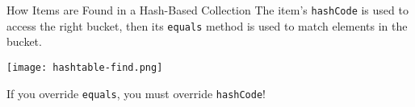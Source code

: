 \documentclass{beamer}
\begin{document}


\begin{frame}[fragile]{How Items are Found in a Hash-Based Collection}
\vspace{-.1in}
The item's {\tt hashCode} is used to access the right bucket, then its {\tt equals} method is used to match elements in the bucket.
\vspace{-.1in}
\begin{center}
\texttt{[image: hashtable-find.png]}
\end{center}
\vspace{-.1in}
If you override {\tt equals}, you must override {\tt hashCode}!
\end{frame}
\end{document}
